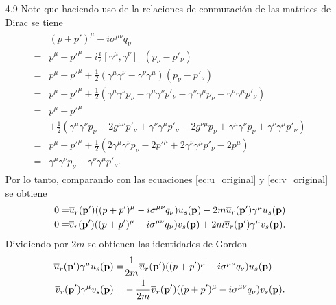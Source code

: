 \documentclass{article}
\begin{document}
\begin{enumerate}
\item[4.9] Note que haciendo uso de la relaciones de conmutación de las matrices de Dirac se tiene 
\begin{align}
\begin{split}
&(p+p')^\mu-i\sigma^{\mu\nu}q_\nu\\
=&p^\mu+{p'}^\mu-i\frac{i}{2}[\gamma^\mu,\gamma^\nu]_{-}(p_\nu-p'_\nu)\\
=&p^\mu+{p'}^\mu+\frac{1}{2}(\gamma^\mu\gamma^\nu-\gamma^\nu\gamma^\mu)(p_\nu-p'_\nu)\\
=&p^\mu+{p'}^\mu+\frac{1}{2}(\gamma^\mu\gamma^\nu p_\nu -\gamma^\mu\gamma^\nu p'_\nu - \gamma^\nu\gamma^\mu p_\nu +\gamma^\nu\gamma^\mu p'_\nu)\\
=&p^\mu+{p'}^\mu\\
&+\frac{1}{2}(\gamma^\mu\gamma^\nu p_\nu-2g^{\mu\nu}p'_\nu+\gamma^\nu\gamma^\mu p'_\nu-2g^{\nu\mu}p_\nu+ \gamma^\mu\gamma^\nu p_\nu +\gamma^\nu\gamma^\mu p'_\nu)\\
=&p^\mu+{p'}^\mu+\frac{1}{2}(2\gamma^\mu\gamma^\nu p_\nu-2p'^\mu+2\gamma^\nu\gamma^\mu p'_\nu-2p^\mu)\\
=&\gamma^\mu\gamma^\nu p_\nu+\gamma^\nu\gamma^\mu p'_\nu. 
\end{split}
\end{align}
Por lo tanto, comparando con las ecuaciones \eqref{ec:u_original} y \eqref{ec:v_original} se obtiene
\begin{align}
\begin{split}
0=&\overline{u}_r(\vb{p'})((p+p')^\mu-i\sigma^{\mu\nu}q_\nu)u_s(\vb{p})-2m\overline{u}_r(\vb{p'})\gamma^\mu u_s(\vb{p})\\
0=&\overline{v}_r(\vb{p'})((p+p')^\mu-i\sigma^{\mu\nu}q_\nu)v_s(\vb{p})+2m\overline{v}_r(\vb{p'})\gamma^\mu v_s(\vb{p}).
\end{split}
\end{align}
Dividiendo por $2m$ se obtienen las identidades de Gordon
\begin{align}
\begin{split}
\overline{u}_r(\vb{p'})\gamma^\mu u_s(\vb{p})=&\frac{1}{2m}\overline{u}_r(\vb{p'})((p+p')^\mu-i\sigma^{\mu\nu}q_\nu)u_s(\vb{p})\\
\overline{v}_r(\vb{p'})\gamma^\mu v_s(\vb{p})=&-\frac{1}{2m}\overline{v}_r(\vb{p'})((p+p')^\mu-i\sigma^{\mu\nu}q_\nu)v_s(\vb{p}).
\end{split}
\end{align}


\end{enumerate}
\end{document}
